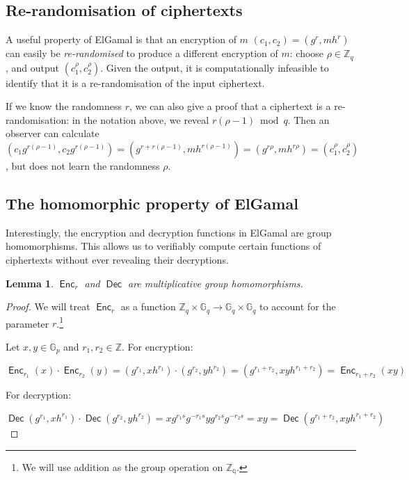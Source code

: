 \documentclass[11pt,twoside,a4paper]{article}
\DeclareMathOperator{\Enc}{\mathsf{Enc}}
\DeclareMathOperator{\Dec}{\mathsf{Dec}}
\newtheorem{lemma}[theorem]{Lemma}
\theoremstyle{definition}
\begin{document}
\subsection{Re-randomisation of ciphertexts}
A useful property of ElGamal is that an encryption of \(m\) \((c_1, c_2)=(g^r, mh^r)\) can easily be \textit{re-randomised} to produce a different encryption of \(m\): choose \(\rho\in\mathbb{Z}_q\), and output \((c_1^\rho, c_2^\rho)\). Given the output, it is computationally infeasible to identify that it is a re-randomisation of the input ciphertext.

If we know the randomness \(r\), we can also give a proof that a ciphertext is a re-randomisation: in the notation above, we reveal \(r(\rho-1)\bmod q\). Then an observer can calculate \((c_1g^{r(\rho-1)}, c_2g^{r(\rho-1)})=(g^{r+r(\rho-1)}, mh^{r(\rho-1)})=(g^{r\rho}, mh^{r\rho})=(c_1^\rho, c_2^\rho)\), but does not learn the randomness \(\rho\).
\subsection{The homomorphic property of ElGamal}
Interestingly, the encryption and decryption functions in ElGamal are group homomorphisms. This allows us to verifiably compute certain functions of ciphertexts without ever revealing their decryptions.
\begin{lemma}\label{lem-mul-homom}
    \(\Enc_r\) and \(\Dec\) are multiplicative group homomorphisms.
\end{lemma}
\begin{proof}
    We will treat \(\Enc_r\) as a function \(\mathbb{Z}_q\times\mathbb{G}_q\rightarrow\mathbb{G}_q\times\mathbb{G}_q\) to account for the parameter \(r\).\footnote{We will use addition as the group operation on \(\mathbb{Z_q}\).}

    Let \(x,y\in\mathbb{G}_p\) and \(r_1,r_2\in\mathbb{Z}\). For encryption:
    
    \[\Enc_{r_1}(x)\cdot\Enc_{r_2}(y)=(g^{r_1},xh^{r_1})\cdot(g^{r_2},yh^{r_2})=(g^{r_1+r_2},xyh^{r_1+r_2})=\Enc_{r_1+r_2}(xy)\]

    For decryption:

    \[\Dec(g^{r_1},xh^{r_1})\cdot\Dec(g^{r_2},yh^{r_2})=xg^{r_1s}g^{-r_1s}yg^{r_2s}g^{-r_2s}=xy=\Dec(g^{r_1+r_2},xyh^{r_1+r_2})\]
\end{proof}
\end{document}
